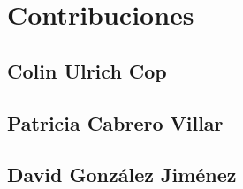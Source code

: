 \chapter{Contribuciones}
\section{Colin Ulrich Cop}
\newpage
\section{Patricia Cabrero Villar}
\newpage
\section{David González Jiménez}

\noindent
